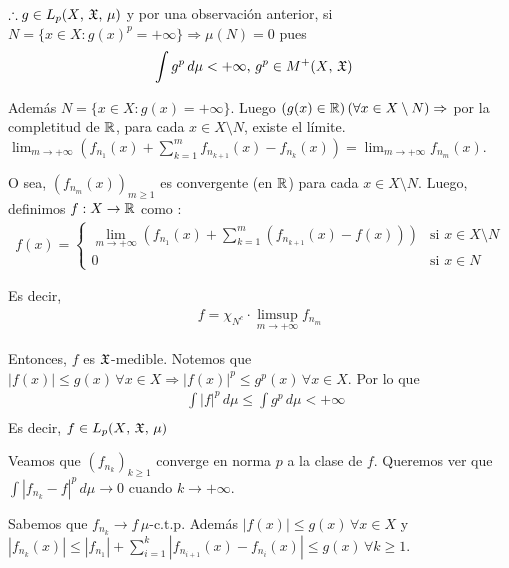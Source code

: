 \(\therefore g \in L_p(X \text{, } \mathfrak{X} \text{, } \mu)\) y por una observación anterior, si \(N = \{ x \in X : g(x)^p = +\infty \} \Rightarrow \mu(N) = 0\) pues \begin{align*}
     & \int g^p \, d \mu < +\infty \text{, } g^p \in M^{+}(X \text{, } \mathfrak{X})
\end{align*}

Además \(N = \{ x \in X : g(x) = +\infty \}\). Luego \((g(x) \in \mathbb{R}) \, (\forall x \in X \setminus N) \Rightarrow\) por la completitud de \(\mathbb{R}\), para cada \(x \in X \setminus N\), existe el límite.
\\

\(\lim_{m \to +\infty} \left( f_{n_1}(x) + \sum_{k = 1}^m f_{n_{k+1}}(x) - f_{n_k}(x) \right) = \lim_{m \to +\infty} f_{n_m}(x)\).

O sea, \((f_{n_m}(x))_{m \geq 1}\) es convergente (en \(\mathbb{R}\)) para cada \(x \in X \setminus N\). Luego,
definimos \(f : X \to \mathbb{R}\) como : \begin{align*}
    f(x) = \begin{cases}
               \lim_{m \to +\infty} \left( f_{n_1}(x) + \sum_{k=1}^m \left( f_{n_{k+1}}(x) - f(x) \right) \right) & \text{si } x \in X \setminus N \\
               0                                                                                                  & \text{si } x \in N
           \end{cases}
\end{align*}

Es decir, \begin{align*}
    f = \chi_{N^c} \cdot \limsup_{m \to +\infty} f_{n_m}
\end{align*}

Entonces, \(f\) es \(\mathfrak{X}\)-medible. Notemos que \(|f(x)| \leq g(x) \, \forall x \in X \Rightarrow |f(x)|^p \leq g^p(x) \, \forall x \in X\).
Por lo que \begin{align*}
     & \int |f|^p \, d\mu \leq \int g^p \, d\mu < +\infty \\
\end{align*}
Es decir, \(f \in L_p(X \text{, } \mathfrak{X} \text{, } \mu)\)

Veamos que \((f_{n_k})_{k \geq 1}\) converge en norma \(p\) a la clase de \(f\). Queremos ver que \(\int |f_{n_k} - f|^p \, d\mu \to 0\) cuando \(k \to +\infty\).

Sabemos que \(f_{n_k} \to f \, \mu \text{-c.t.p}\). Además \(|f(x)| \leq g(x) \, \forall x \in X\) y \(|f_{n_k}(x)| \leq |f_{n_1}| + \sum_{i = 1}^k |f_{n_{i+1}}(x) - f_{n_i}(x)| \leq g(x) \, \forall k \geq 1\).

